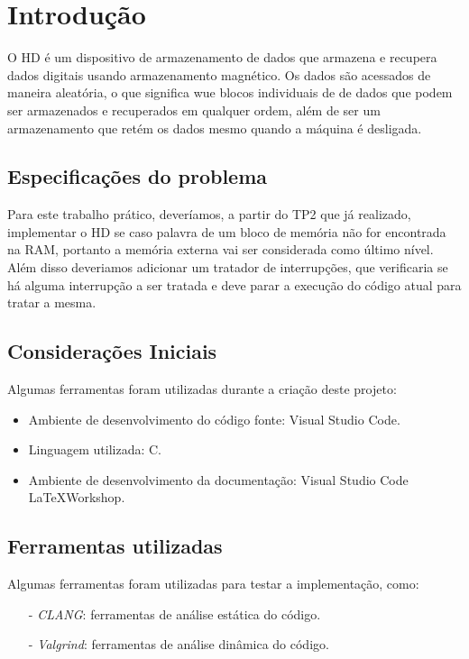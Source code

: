 \documentclass{article}
\begin{document}



\section{Introdução}
O HD  é um dispositivo de armazenamento de dados que armazena e recupera dados digitais usando armazenamento magnético. Os dados são acessados de maneira aleatória, o que significa wue blocos individuais de de dados que podem ser armazenados e recuperados em qualquer ordem, além de
ser um armazenamento que retém os dados mesmo quando a máquina é desligada.
\subsection{Especificações do problema}

Para este trabalho prático, deveríamos, a partir do TP2 que já realizado, implementar o HD se caso palavra de um bloco de memória não for encontrada na RAM, portanto a memória
externa vai ser considerada como último nível. Além disso deveriamos adicionar um tratador de interrupções, que verificaria se
há alguma interrupção a ser tratada e deve parar a execução do código atual para tratar a mesma. 

\subsection{Considerações Iniciais}
Algumas ferramentas foram utilizadas durante a criação deste projeto:

\begin{itemize}
  \item Ambiente de desenvolvimento do código fonte: Visual Studio Code.
  \item Linguagem utilizada: C.
  \item Ambiente de desenvolvimento da documentação: Visual Studio Code \LaTeX Workshop.
\end{itemize}

\subsection{Ferramentas utilizadas}
Algumas ferramentas foram utilizadas para testar a implementação, como:

\begin{itemize}
    \item[-] \textit{CLANG}: ferramentas de análise estática do código.
    \item[-] \textit{Valgrind}: ferramentas de análise dinâmica do código.
\end{itemize}
\end{document}

